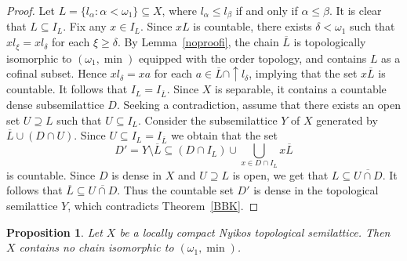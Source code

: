 \documentclass[12pt, twoside, leqno]{article}
\newtheorem{proposition}[theorem]{Proposition}
\theoremstyle{definition}
\numberwithin{equation}{section}
\newcommand{\w}{\omega}
\begin{document}
\begin{proof}
Let $L=\{l_{\alpha}:\alpha<\w_1\}\subseteq X$, where $l_{\alpha}\leq l_{\beta}$ if and only if $\alpha\leq \beta$. It is clear that $L\subseteq I_L$. 
Fix any $x\in I_L$. 
Since $xL$ is countable, there exists $\delta<\w_1$ such that $xl_{\xi}=xl_{\delta}$ for each $\xi\geq \delta$. %
By Lemma~\ref{noproofi}, the chain $\overline{L}$ is topologically isomorphic to $(\w_1,\min)$ equipped with the order topology, and contains $L$ as a cofinal subset. Hence $xl_{\delta}=xa$ for each $a\in \overline L\cap {\uparrow}l_{\delta}$, implying that the set $x\overline L$ is countable. It follows that $I_L=I_{\overline{L}}$. Since $X$ is separable, it contains a countable dense subsemilattice $D$. Seeking a contradiction, assume that there exists an open set $U\supseteq L$ such that $U\subseteq  I_L$.
Consider the subsemilattice $Y$ of $X$ generated by $\overline{L}\cup (D\cap U)$.
Since $U\subseteq I_L=I_{\overline{L}}$ we obtain that the set 
$$D'=Y\setminus \overline{L}\subseteq (D\cap I_L)\cup\bigcup_{x\in D\cap I_L}x\overline{L}$$ 
is countable.  Since $D$ is dense in $X$ and $U\supseteq L$ is open, we get that $L\subseteq \overline{U\cap D}$. It follows that $\overline{L}\subseteq \overline{U\cap D}$. Thus the countable set $D'$ is dense in the topological semilattice $Y$, which contradicts Theorem~\ref{BBK}.  
\end{proof}





\begin{proposition}\label{w1}
Let $X$ be a locally compact Nyikos topological semilattice. Then $X$ contains no chain isomorphic to $(\w_1,\min)$.      
\end{proposition}
\end{document}
